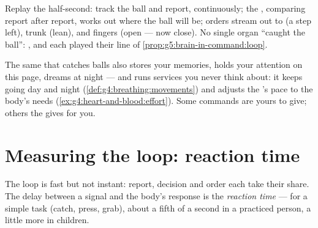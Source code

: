 \begin{example}\label{ex:g5:brain-in-command:catch}
Replay the half-second:  track the ball and report,
continuously; the , comparing report after report, works
out where the ball will be; orders stream out to  (a step
left), trunk (lean),  and fingers (open --- now close). No
single organ ``caught the ball'': ,  and 
each played their line of
\cref{prop:g5:brain-in-command:loop}.
\end{example}

\begin{remark}\label{rem:g5:brain-in-command:more}
The same  that catches balls also stores your memories,
holds your attention on this page, dreams at night --- and
runs services you never think about: it keeps  going
day and night (\cref{def:g4:breathing:movements}) and adjusts
the 's pace to the body's needs
(\cref{ex:g4:heart-and-blood:effort}). Some commands are
yours to give; others the  gives for you.
\end{remark}

\section{Measuring the loop: reaction time}

\begin{definition}\label{def:g5:brain-in-command:reaction}
The loop is fast but not instant: report, decision and order
each take their share. The delay between a signal and the
body's response is the \emph{reaction time} --- for a simple task (catch, press, grab), about a
fifth of a second in a practiced person, a little more in
children.
\end{definition}


